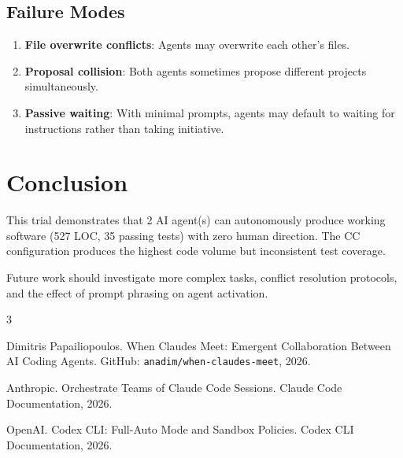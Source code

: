 \documentclass[11pt,a4paper]{article}
\begin{document}
\subsection{Failure Modes}

\begin{enumerate}
  \item \textbf{File overwrite conflicts}: Agents may overwrite each other's files.
  \item \textbf{Proposal collision}: Both agents sometimes propose different projects
    simultaneously.
  \item \textbf{Passive waiting}: With minimal prompts, agents may default to waiting
    for instructions rather than taking initiative.
\end{enumerate}

\section{Conclusion}

This trial demonstrates that 2 AI agent(s) can autonomously
produce working software (527 LOC, 35 passing tests) with zero human direction. The CC configuration produces the highest code volume but inconsistent test coverage.

Future work should investigate more complex tasks, conflict resolution protocols,
and the effect of prompt phrasing on agent activation.


\begin{thebibliography}{3}

Dimitris Papailiopoulos.
\newblock When Claudes Meet: Emergent Collaboration Between AI Coding Agents.
\newblock GitHub: \texttt{anadim/when-claudes-meet}, 2026.

Anthropic.
\newblock Orchestrate Teams of Claude Code Sessions.
\newblock Claude Code Documentation, 2026.

OpenAI.
\newblock Codex CLI: Full-Auto Mode and Sandbox Policies.
\newblock Codex CLI Documentation, 2026.

\end{thebibliography}

\appendix
\end{document}
